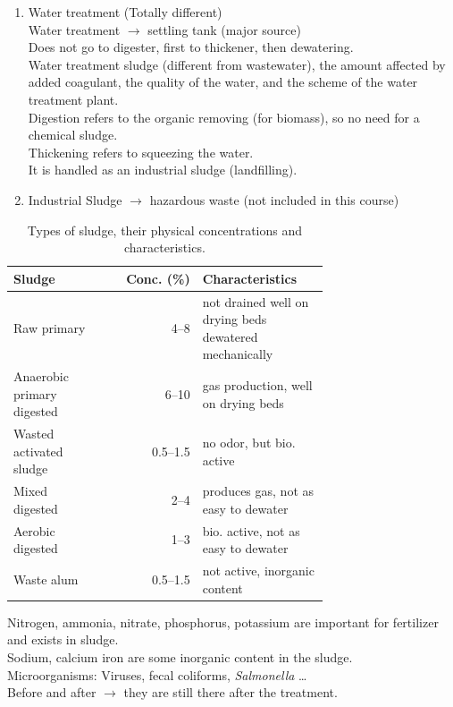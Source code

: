 \documentclass{article}
\numberwithin{equation}{section}
\begin{document}
\begin{itemize}
\begin{enumerate}
    \item Water treatment (Totally different)\\
    Water treatment $\rightarrow$ settling tank (major source)\\
    Does not go to digester, first to thickener, then dewatering.\\
    Water treatment sludge (different from wastewater), the amount affected by added coagulant, the quality of the water, and the scheme of the water treatment plant.\\
    Digestion  refers to the organic removing (for biomass), so no need for a chemical sludge.\\
    Thickening refers to squeezing the water.\\
    It is handled as an industrial sludge (landfilling).
    \item Industrial Sludge $\rightarrow$ hazardous waste (not included in this course)
    \end{enumerate}
\end{itemize}

\begin{table}[htbp]
    \caption{\label{tab:sludge_types}Types of sludge, their physical concentrations and characteristics.}
    \centering
    \begin{tabular}{p{0.3\linewidth}rp{0.4\linewidth}}
        \toprule
        Sludge & Conc. (\%) & Characteristics \\
        \midrule
        Raw primary & 4--8 & not drained well on drying beds \newline dewatered mechanically\\
        Anaerobic primary digested & 6--10 & gas production, well on drying beds\\
        Wasted activated sludge & 0.5--1.5 & no odor, but bio. active\\
        Mixed digested & 2--4 & produces gas, not as easy to dewater\\
        Aerobic digested & 1--3 & bio. active, not as easy to dewater\\
        Waste alum & 0.5--1.5 & not active, inorganic content\\
        \bottomrule
    \end{tabular}
\end{table}

Nitrogen, ammonia, nitrate, phosphorus, potassium are important for fertilizer and exists in sludge.\\
Sodium, calcium iron are some inorganic content in the sludge.\\
Microorganisms: Viruses, fecal coliforms, \textsl{Salmonella} \ldots\\
Before and after $\rightarrow$ they are still there after the treatment.
\end{document}
